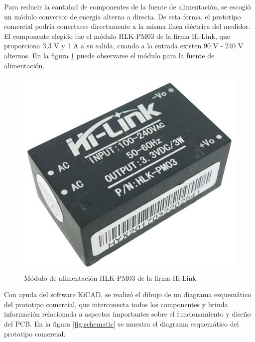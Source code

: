 Para reducir la cantidad de componentes de la fuente de alimentación, se escogió un módulo conversor de energía alterna a directa. De esta forma, el prototipo comercial podría conectarse directamente a la misma línea eléctrica del medidor. El componente elegido fue el módulo HLK-PM03 de la firma Hi-Link, que proporciona 3,3 V y 1 A a su salida, cuando a la entrada existen 90 V - 240 V alternos. En la figura \ref{fig:powerModule} puede observarse el módulo para la fuente de alimentación.

\begin{figure}[h]
	\centering
	\includegraphics[scale=0.26]{./Figures/acdc_module.jpg}
	\caption{Módulo de alimentación HLK-PM03 de la firma Hi-Link\protect\footnotemark.}
		\label{fig:powerModule}
\end{figure}

	
Con ayuda del software KiCAD, se realizó el dibujo de un diagrama esquemático del prototipo comercial, que interconecta todos los componentes y brinda información relacionada a aspectos importantes sobre el funcionamiento y diseño del PCB. En la figura \ref{fig:schematic} se muestra el diagrama esquemático del prototipo comercial.

